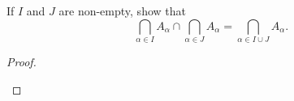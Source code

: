 \documentclass[../../main.tex]{subfiles}
\begin{document}
\begin{q}
    If $I$ and $J$ are non-empty, show that
    \[\bigcap_{\alpha \in I} A_\alpha \cap \bigcap_{\alpha \in J} A_\alpha = \bigcap_{\alpha \in I \cup J} A_\alpha.\]
\end{q}


\begin{proof}
    
    \begin{xx}
    \begin{lxl}
        
    \end{lxl}
    \end{xx}
\end{proof}
\end{document}
